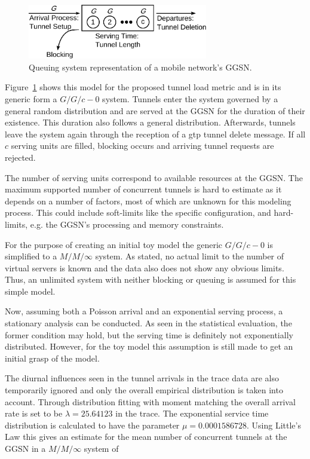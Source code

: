 \begin{figure}[htb]
	\centering
	\includegraphics[width=0.7\textwidth]{images/GGn-model.pdf}
	\caption{Queuing system representation of a mobile network's \gls{GGSN}.}
\label{c4:fig:ggn-model}
\end{figure}


Figure~\ref{c4:fig:ggn-model} shows this model for the proposed tunnel load metric and is in its generic form a $G/G/c-0$ system. Tunnels enter the system governed by a general random distribution and are served at the \gls{GGSN} for the duration of their existence. This duration also follows a general distribution. Afterwards, tunnels leave the system again through the reception of a \gls{gtp} tunnel delete message. If all $c$ serving units are filled, blocking occurs and arriving tunnel requests are rejected.

The number of serving units correspond to available resources at the \gls{GGSN}. The maximum supported number of concurrent tunnels is hard to estimate as it depends on a number of factors, most of which are unknown for this modeling process. This could include soft-limits like the specific configuration, and hard-limits, e.g. the \gls{GGSN}'s processing and memory constraints. 

For the purpose of creating an initial toy model the generic $G/G/c-0$ is simplified to a $M/M/\infty$ system. As stated, no actual limit to the number of virtual servers is known and the data also does not show any obvious limits. Thus, an unlimited system with neither blocking or queuing is assumed for this simple model.

Now, assuming both a Poisson arrival and an exponential serving process, a stationary analysis can be conducted. As seen in the statistical evaluation, the former condition may hold, but the serving time is definitely not exponentially distributed. However, for the toy model this assumption is still made to get an initial grasp of the model.

The diurnal influences seen in the tunnel arrivals in the trace data are also temporarily ignored and only the overall empirical distribution is taken into account. Through distribution fitting with moment matching the overall arrival rate is set to be $\lambda=25.64123$ in the trace. The exponential service time distribution is calculated to have the parameter $\mu=0.0001586728$. Using Little's Law this gives an estimate for the mean number of concurrent tunnels at the \gls{GGSN} in a $M/M/\infty$ system of 

